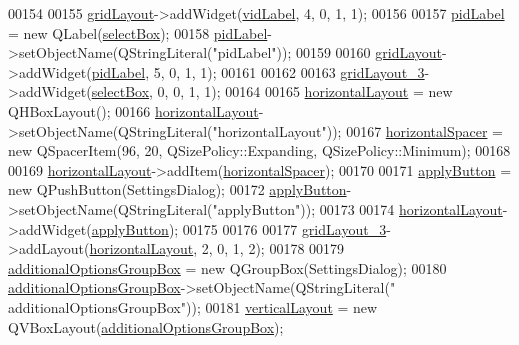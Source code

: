 \begin{DoxyCode}
00154 
00155         \hyperlink{a00029_a07d152c7cc63e2cffdda613baea54c0f}{gridLayout}->addWidget(\hyperlink{a00029_a50c8fdd36faae6146740e37728af71f2}{vidLabel}, 4, 0, 1, 1);
00156 
00157         \hyperlink{a00029_a8ad53ddf3a11421d99dfa6fec8c92cfc}{pidLabel} = \textcolor{keyword}{new} QLabel(\hyperlink{a00029_aea3871481f7ecb94f1835e519631f9a2}{selectBox});
00158         \hyperlink{a00029_a8ad53ddf3a11421d99dfa6fec8c92cfc}{pidLabel}->setObjectName(QStringLiteral(\textcolor{stringliteral}{"pidLabel"}));
00159 
00160         \hyperlink{a00029_a07d152c7cc63e2cffdda613baea54c0f}{gridLayout}->addWidget(\hyperlink{a00029_a8ad53ddf3a11421d99dfa6fec8c92cfc}{pidLabel}, 5, 0, 1, 1);
00161 
00162 
00163         \hyperlink{a00029_a2cc53955b73f22f0cfcf508da4654b16}{gridLayout\_3}->addWidget(\hyperlink{a00029_aea3871481f7ecb94f1835e519631f9a2}{selectBox}, 0, 0, 1, 1);
00164 
00165         \hyperlink{a00029_a5519b84cf0fd4124e77643ce5600a251}{horizontalLayout} = \textcolor{keyword}{new} QHBoxLayout();
00166         \hyperlink{a00029_a5519b84cf0fd4124e77643ce5600a251}{horizontalLayout}->setObjectName(QStringLiteral(\textcolor{stringliteral}{"horizontalLayout"}));
00167         \hyperlink{a00029_a91941a5010b87cc8a0c26a641d4a7808}{horizontalSpacer} = \textcolor{keyword}{new} QSpacerItem(96, 20, QSizePolicy::Expanding, 
      QSizePolicy::Minimum);
00168 
00169         \hyperlink{a00029_a5519b84cf0fd4124e77643ce5600a251}{horizontalLayout}->addItem(\hyperlink{a00029_a91941a5010b87cc8a0c26a641d4a7808}{horizontalSpacer});
00170 
00171         \hyperlink{a00029_adc885543c05d0026019ec678b4d08c5c}{applyButton} = \textcolor{keyword}{new} QPushButton(SettingsDialog);
00172         \hyperlink{a00029_adc885543c05d0026019ec678b4d08c5c}{applyButton}->setObjectName(QStringLiteral(\textcolor{stringliteral}{"applyButton"}));
00173 
00174         \hyperlink{a00029_a5519b84cf0fd4124e77643ce5600a251}{horizontalLayout}->addWidget(\hyperlink{a00029_adc885543c05d0026019ec678b4d08c5c}{applyButton});
00175 
00176 
00177         \hyperlink{a00029_a2cc53955b73f22f0cfcf508da4654b16}{gridLayout\_3}->addLayout(\hyperlink{a00029_a5519b84cf0fd4124e77643ce5600a251}{horizontalLayout}, 2, 0, 1, 2);
00178 
00179         \hyperlink{a00029_a996d0cf4818dae895375cb43b996e0dc}{additionalOptionsGroupBox} = \textcolor{keyword}{new} QGroupBox(SettingsDialog);
00180         \hyperlink{a00029_a996d0cf4818dae895375cb43b996e0dc}{additionalOptionsGroupBox}->setObjectName(QStringLiteral(\textcolor{stringliteral}{"
      additionalOptionsGroupBox"}));
00181         \hyperlink{a00029_aad19d26806d7e14548233852ac97c26f}{verticalLayout} = \textcolor{keyword}{new} QVBoxLayout(\hyperlink{a00029_a996d0cf4818dae895375cb43b996e0dc}{additionalOptionsGroupBox});

\end{DoxyCode}
